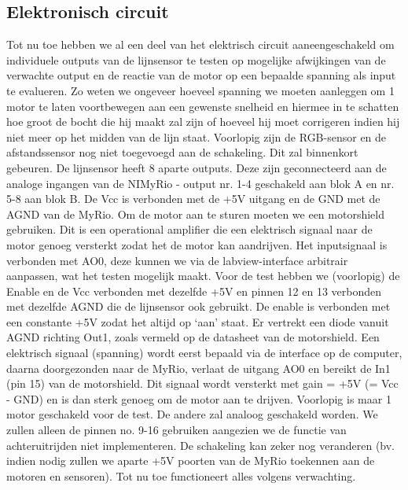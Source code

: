 \documentclass[kulak]{kulakarticle} %
\begin{document}
\subsection{Elektronisch circuit}
Tot nu toe hebben we al een deel van het elektrisch circuit aaneengeschakeld om individuele outputs van de lijnsensor te testen op mogelijke afwijkingen van de verwachte output en de reactie van de motor op een bepaalde spanning als input te evalueren. Zo weten we ongeveer hoeveel spanning we moeten aanleggen om 1 motor te laten voortbewegen aan een gewenste snelheid en hiermee in te schatten hoe groot de bocht die hij maakt zal zijn of hoeveel hij moet corrigeren indien hij niet meer op het midden van de lijn staat. 
Voorlopig zijn de RGB-sensor en de afstandssensor nog niet toegevoegd aan de schakeling. Dit zal binnenkort gebeuren.
De lijnsensor heeft 8 aparte outputs. Deze zijn geconnecteerd aan de analoge ingangen van de NIMyRio - output nr. 1-4 geschakeld aan blok A en nr. 5-8 aan blok B. De Vcc is verbonden met de +5V uitgang en de GND met de AGND van de MyRio.
Om de motor aan te sturen moeten we een motorshield gebruiken. Dit is een operational amplifier die een elektrisch signaal naar de motor genoeg versterkt zodat het de motor kan aandrijven. Het inputsignaal is verbonden met AO0, deze kunnen we via de labview-interface arbitrair aanpassen, wat het testen mogelijk maakt. Voor de test hebben we (voorlopig) de Enable en de Vcc verbonden met dezelfde +5V en pinnen 12 en 13 verbonden met dezelfde AGND die de lijnsensor ook gebruikt. De enable is verbonden met een constante +5V zodat het altijd op ‘aan’ staat. Er vertrekt een diode vanuit AGND richting Out1, zoals vermeld op de datasheet van de motorshield. 
Een elektrisch signaal (spanning) wordt eerst bepaald via de interface op de computer, daarna doorgezonden naar de MyRio, verlaat de uitgang AO0 en bereikt de In1 (pin 15) van de motorshield. Dit signaal wordt versterkt met gain = +5V (= Vcc - GND) en is dan sterk genoeg om de motor aan te drijven.
Voorlopig is maar 1 motor geschakeld voor de test. De andere zal analoog geschakeld worden. We zullen alleen de pinnen no. 9-16 gebruiken aangezien we de functie van achteruitrijden niet implementeren.
De schakeling kan zeker nog veranderen (bv. indien nodig zullen we aparte +5V poorten van de MyRio toekennen aan de motoren en sensoren). Tot nu toe functioneert alles volgens verwachting.
\end{document}
